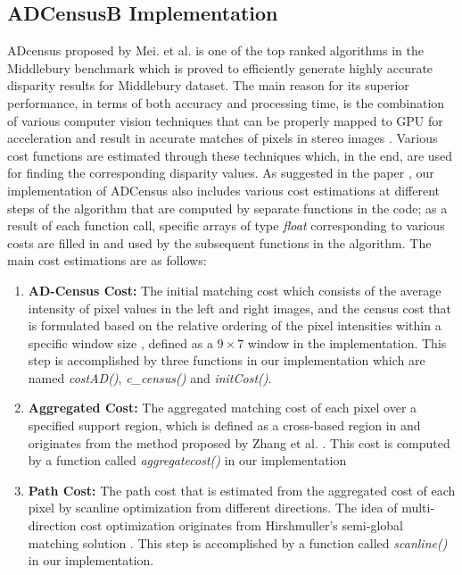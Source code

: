 \subsection{ADCensusB Implementation} \label{subsec:adcB}
ADcensus proposed by Mei. et al. is one of the top ranked algorithms in the Middlebury benchmark \cite{mideval} which is proved to efficiently generate highly accurate disparity 
results for Middlebury dataset. The main reason for its superior performance, in terms of both accuracy and processing time, is the combination of various computer vision techniques that can 
be properly mapped to GPU for acceleration and result in accurate matches of pixels in stereo images \cite{mei11}.  Various cost functions are estimated through these techniques 
which, in the end, are used for finding the corresponding
disparity values. As suggested in the paper \cite{mei11}, our implementation of ADCensus also includes various cost estimations
at different steps of the algorithm that are computed by separate functions in the code; as a result of each function call, 
specific arrays of type \textit{float} corresponding to various costs are filled in and used by the subsequent functions in the algorithm.
The main cost estimations are as follows:
\begin{enumerate}
\item \textbf{AD-Census Cost:} The initial matching cost which consists of the average intensity of pixel values in the left and right images, 
and the census cost that is formulated
based on the relative ordering of the pixel intensities within a specific window size \cite{hirseval09}, defined as a $9\times7$ window in the implementation. This 
step is accomplished by three functions in our implementation which are named \textit{costAD()}, \textit{c\_census()} and \textit{initCost()}.
\item \textbf{Aggregated Cost:} The aggregated matching cost of each pixel over a specified support region, which is defined as a cross-based 
region in \cite{mei11} and originates from the method proposed by Zhang et al. \cite{zha09}. This cost is computed by a function called \textit{aggregatecost()}
in our implementation
\item \textbf{Path Cost:} The path cost that is estimated from the aggregated cost of each pixel by scanline optimization from different directions. The idea of
multi-direction cost optimization originates from Hirshmuller's semi-global matching solution \cite{hir08}. This step is accomplished by a function called 
\textit{scanline()} in our implementation.
\end{enumerate}

